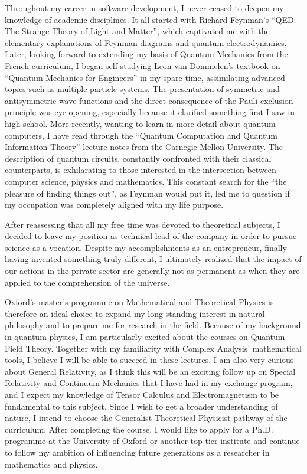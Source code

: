 \documentclass[10pt]{article}
\begin{document}
Throughout my career in software development, I never ceased to deepen my knowledge of academic disciplines. It all started with Richard Feynman's ``QED: The Strange Theory of Light and Matter'', which captivated me with the elementary explanations of Feynman diagrams and quantum electrodynamics. Later, looking forward to extending my basis of Quantum Mechanics from the French curriculum, I began self-studying Leon van Dommelen's textbook on ``Quantum Mechanics for Engineers'' in my spare time, assimilating advanced topics such as multiple-particle systems. The presentation of symmetric and antisymmetric wave functions and the direct consequence of the Pauli exclusion principle was eye opening, especially because it clarified something first I saw in high school. More recently, wanting to learn in more detail about quantum computers, I have read through the ``Quantum Computation and Quantum Information Theory'' lecture notes from the Carnegie Mellon University. The description of quantum circuits, constantly confronted with their classical counterparts, is exhilarating to those interested in the intersection between computer science, physics and mathematics. This constant search for the ``the pleasure of finding things out'', as Feynman would put it, led me to question if my occupation was completely aligned with my life purpose.

After reassessing that all my free time was devoted to theoretical subjects, I decided to leave my position as technical lead of the company in order to pursue science as a vocation. Despite my accomplishments as an entrepreneur, finally having invented something truly different, I ultimately realized that the impact of our actions in the private sector are generally not as permanent as when they are applied to the comprehension of the universe.

Oxford's master's programme on Mathematical and Theoretical Physics is therefore an ideal choice to expand my long-standing interest in natural philosophy and to prepare me for research in the field. Because of my background in quantum physics, I am particularly excited about the courses on Quantum Field Theory. Together with my familiarity with Complex Analysis' mathematical tools, I believe I will be able to succeed in these lectures. I am also very curious about General Relativity, as I think this will be an exciting follow up on Special Relativity and Continuum Mechanics that I have had in my exchange program, and I expect my knowledge of Tensor Calculus and Electromagnetism to be fundamental to this subject. Since I wish to get a broader understanding of nature, I intend to choose the Generalist Theoretical Physicist pathway of the curriculum. After completing the course, I would like to apply for a Ph.D. programme at the University of Oxford or another top-tier institute and continue to follow my ambition of influencing future generations as a researcher in mathematics and physics.

\end{document}
